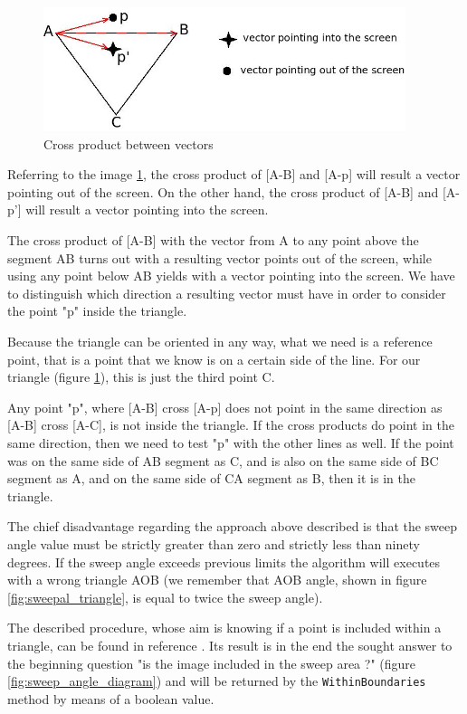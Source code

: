 %
\begin{figure}[!h]
  \begin{center}
    \includegraphics[width=300pt]{img/sweepal_crossproductABC.jpeg} 
    \caption{Cross product between vectors}
    \label{fig:sweepal_crossproductABC}
  \end{center}
\end{figure}
%

Referring to the image \ref{fig:sweepal_crossproductABC}, the cross product of [A-B] and [A-p] will result a vector
pointing out of the screen. On the other hand, the cross product of [A-B] and [A-p'] will result a vector pointing
into the screen.
%

%
The cross product of [A-B] with the vector from A to any point above the segment AB turns out with a resulting vector
points out of the screen, while using any point below AB yields with a vector pointing into the screen. We have to
distinguish which direction a resulting vector must have in order to consider the point "p" inside the triangle.
%

%
Because the triangle can be oriented in any way, what we need is a reference point, that is a point that we know is
on a certain side of the line. For our triangle (figure \ref{fig:sweepal_crossproductABC}), this is just the third
point C.
%

%
Any point "p", where [A-B] cross [A-p] does not point in the same direction as [A-B] cross [A-C], is not inside the
triangle. If the cross products do point in the same direction, then we need to test "p" with the other lines as well.
If the point was on the same side of AB segment as C, and is also on the same side of BC segment as A, and on the same
side of CA segment as B, then it is in the triangle.
%

%
The chief disadvantage regarding the approach above described is that the sweep angle value must be strictly greater
than zero and strictly less than ninety degrees. If the sweep angle exceeds previous limits the algorithm will executes
with a wrong triangle AOB (we remember that AOB angle, shown in figure \ref{fig:sweepal_triangle}, is equal to twice
the sweep angle).
%

%
The described procedure, whose aim is knowing if a point is included within a triangle, can be found in reference
\cite{withinboundaries:pointintriangle}. Its result is in the end the sought answer to the beginning question "is the
image included in the sweep area ?" (figure \ref{fig:sweep_angle_diagram}) and will be returned by the
\texttt{WithinBoundaries} method by means of a boolean value.
%
